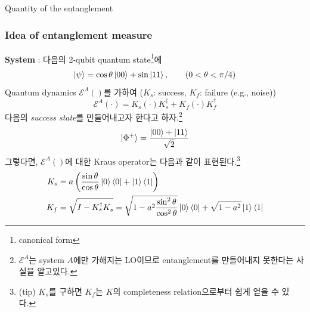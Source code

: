 \documentclass[9pt]{beamer}
\begin{document}
    \begin{section}{Quantity of the entanglement}
        \begin{frame}
            \frametitle{Idea of entanglement measure}
            \textbf{System} : 다음의 2-qubit quantum state\footnote{canonical form}에
            \begin{equation*}
                \ket{\psi} = \cos \theta \ket{00} + \sin \ket{11},\qquad (0< \theta < \pi/4)
            \end{equation*}
            Quantum dynamics $\mathcal E^A()$를 가하여 ($K_s$: success, $K_f$: failure (e.g., noise))
            \begin{equation*}
                \mathcal E^A(\cdot) = K_s (\cdot) K_s^\dagger +  K_f (\cdot) K_f^\dagger
            \end{equation*}
            다음의 \textit{success state}를 만들어내고자 한다고 하자.\footnote{$\mathcal E^A$는 system $A$에만 가해지는 LO이므로 entanglement를 만들어내지 못한다는 사실을 알고있다.}
            \begin{equation*}
                \ket{\Phi^+} = \frac{\ket{00} + \ket{11}}{\sqrt 2}
            \end{equation*}
            그렇다면, $\mathcal E^A()$에 대한 Kraus operator는 다음과 같이 표현된다.\footnote{(tip) $K_s$를 구하면 $K_f$는 $K$의 completeness relation으로부터 쉽게 얻을 수 있다.}
            \begin{align*}
                K_s &= a \left(\frac{\sin \theta}{\cos \theta} \ket 0 \bra 0 + \ket 1 \bra 1\right)\\
                K_f &= \sqrt{I - K_s^\dagger K_s} = \sqrt{1 - a^2 \frac{\sin^2 \theta}{\cos^2 \theta}} \ket 0 \bra 0 + \sqrt{1-a^2} \ket 1 \bra 1
            \end{align*}
        \end{frame}


\end{section}
\end{document}
